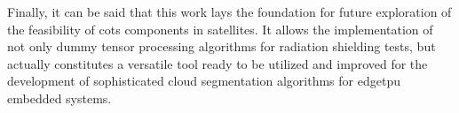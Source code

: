 {Finally, it can be said that this work lays the foundation for future exploration of the feasibility of \gls{cots} components in satellites.
It allows the implementation of not only dummy tensor processing algorithms for radiation shielding tests,
but actually constitutes a versatile tool ready to be utilized and improved
for the development of sophisticated cloud segmentation algorithms for \gls{edgetpu} embedded systems.


}